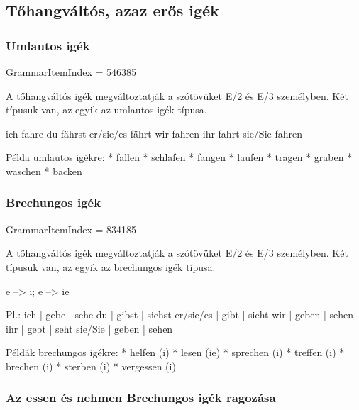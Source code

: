 \documentclass{article}
\newenvironment{desc}{\verbatim}{\endverbatim}
\newenvironment{exmp}{\verbatim}{\endverbatim}
\begin{document}
\subsection{Tőhangváltós, azaz erős igék}

\subsubsection{Umlautos igék}

GrammarItemIndex = 546385

\begin{desc}
A tőhangváltós igék megváltoztatják a szótövüket E/2 és E/3 személyben. Két típusuk van, az egyik az umlautos igék típusa.

ich fahre 
du fährst 
er/sie/es fährt 
wir fahren 
ihr fahrt 
sie/Sie fahren 

Példa umlautos igékre:
* fallen
* schlafen
* fangen
* laufen
* tragen
* graben
* waschen
* backen
\end{desc}

\begin{exmp}
\end{exmp}

\subsubsection{Brechungos igék}

GrammarItemIndex = 834185

\begin{desc}
A tőhangváltós igék megváltoztatják a szótövüket E/2 és E/3 személyben. Két típusuk van, az egyik az brechungos igék típusa.

e --> i; e --> ie

Pl.:
ich       | gebe  | sehe 
du        | gibst | siehst
er/sie/es | gibt  | sieht 
wir       | geben | sehen 
ihr       | gebt  | seht 
sie/Sie   | geben | sehen 

Példák brechungos igékre:
* helfen (i)
* lesen (ie)
* sprechen (i)
* treffen (i)
* brechen (i)
* sterben (i)
* vergessen (i)
\end{desc}

\begin{exmp}
\end{exmp}

\subsubsection{Az essen és nehmen Brechungos igék ragozása}
\end{document}
